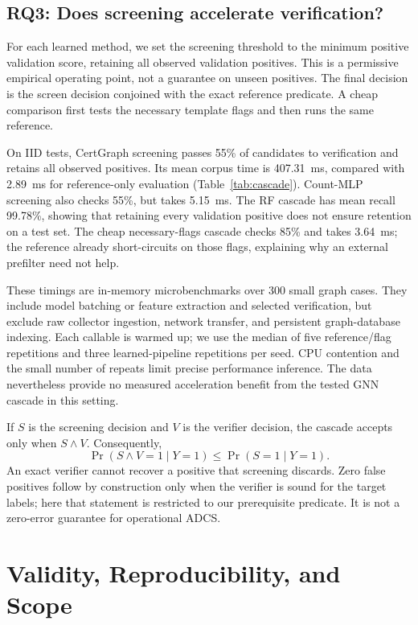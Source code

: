 \documentclass[journal]{IEEEtran}
\begin{document}
\subsection{RQ3: Does screening accelerate verification?}
For each learned method, we set the screening threshold to the minimum positive validation score, retaining all observed validation positives. This is a permissive empirical operating point, not a guarantee on unseen positives. The final decision is the screen decision conjoined with the exact reference predicate. A cheap comparison first tests the necessary template flags and then runs the same reference.


On IID tests, CertGraph screening passes 55\% of candidates to verification and retains all observed positives. Its mean corpus time is 407.31~ms, compared with 2.89~ms for reference-only evaluation (Table~\ref{tab:cascade}). Count-MLP screening also checks 55\%, but takes 5.15~ms. The RF cascade has mean recall 99.78\%, showing that retaining every validation positive does not ensure retention on a test set. The cheap necessary-flags cascade checks 85\% and takes 3.64~ms; the reference already short-circuits on those flags, explaining why an external prefilter need not help.

These timings are in-memory microbenchmarks over 300 small graph cases. They include model batching or feature extraction and selected verification, but exclude raw collector ingestion, network transfer, and persistent graph-database indexing. Each callable is warmed up; we use the median of five reference/flag repetitions and three learned-pipeline repetitions per seed. CPU contention and the small number of repeats limit precise performance inference. The data nevertheless provide no measured acceleration benefit from the tested GNN cascade in this setting.

If $S$ is the screening decision and $V$ is the verifier decision, the cascade accepts only when $S\land V$. Consequently,
\begin{equation}
 \Pr(S\land V=1\mid Y=1)\leq\Pr(S=1\mid Y=1).
\end{equation}
An exact verifier cannot recover a positive that screening discards. Zero false positives follow by construction only when the verifier is sound for the target labels; here that statement is restricted to our prerequisite predicate. It is not a zero-error guarantee for operational ADCS.

\section{Validity, Reproducibility, and Scope}
\end{document}
